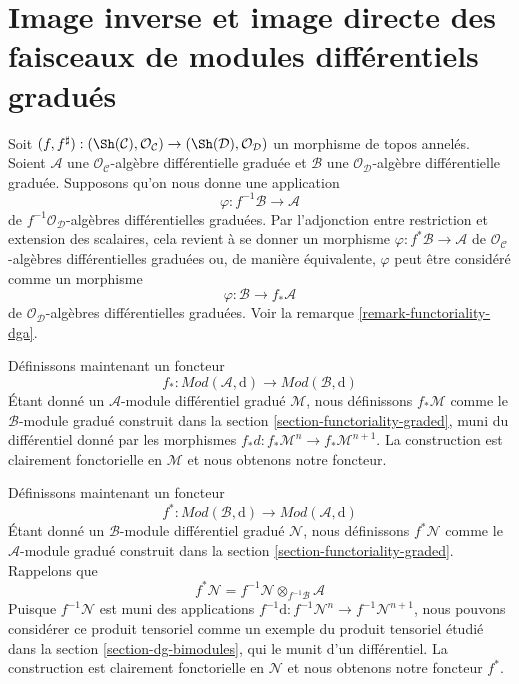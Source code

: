 \section{Image inverse et image directe des faisceaux de modules différentiels gradués}
\label{section-functoriality-dg}

\noindent
Soit $(f, f^\sharp) : (\Sh(\mathcal{C}), \mathcal{O}_\mathcal{C})
\to (\Sh(\mathcal{D}), \mathcal{O}_\mathcal{D})$ un morphisme
de topos annelés. Soient $\mathcal{A}$ une
$\mathcal{O}_\mathcal{C}$-algèbre différentielle graduée et $\mathcal{B}$ une
$\mathcal{O}_\mathcal{D}$-algèbre différentielle graduée. Supposons qu'on nous donne
une application
$$
\varphi : f^{-1}\mathcal{B} \to \mathcal{A}
$$ de
$f^{-1}\mathcal{O}_\mathcal{D}$-algèbres différentielles graduées. Par l'adjonction
entre restriction et extension des scalaires, cela revient à se donner
un morphisme $\varphi : f^*\mathcal{B} \to \mathcal{A}$ de
$\mathcal{O}_\mathcal{C}$-algèbres différentielles graduées ou, de manière équivalente,
$\varphi$ peut être considéré comme un morphisme
$$
\varphi : \mathcal{B} \to f_*\mathcal{A}
$$
de $\mathcal{O}_\mathcal{D}$-algèbres différentielles graduées.
Voir la remarque \ref{remark-functoriality-dga}.

\medskip\noindent
Définissons maintenant un
foncteur $$
f_*
: \textit{Mod}(\mathcal{A}, \text{d})
\longrightarrow
\textit{Mod}(\mathcal{B}, \text{d})
$$
Étant donné un $\mathcal{A}$-module différentiel gradué $\mathcal{M}$, nous
définissons $f_*\mathcal{M}$ comme le $\mathcal{B}$-module gradué construit dans
la section \ref{section-functoriality-graded}, muni du différentiel
donné par les morphismes $f_*d : f_*\mathcal{M}^n \to f_*\mathcal{M}^{n + 1}$. La
construction est clairement fonctorielle en
$\mathcal{M}$ et nous obtenons notre foncteur.

\medskip\noindent
Définissons maintenant un
foncteur $$
f^*
: \textit{Mod}(\mathcal{B}, \text{d})
\longrightarrow
\textit{Mod}(\mathcal{A}, \text{d})
$$
Étant donné un $\mathcal{B}$-module différentiel gradué $\mathcal{N}$,
nous définissons $f^*\mathcal{N}$ comme le $\mathcal{A}$-module
gradué construit dans la section \ref{section-functoriality-graded}.
Rappelons
que $$
f^*\mathcal{N} = f^{-1}\mathcal{N} \otimes_{f^{-1}\mathcal{B}} \mathcal{A}
$$
Puisque $f^{-1}\mathcal{N}$ est muni des applications
$f^{-1}\text{d} : f^{-1}\mathcal{N}^n \to f^{-1}\mathcal{N}^{n + 1}$, nous
pouvons considérer ce produit tensoriel comme un exemple
du produit tensoriel étudié dans la section \ref{section-dg-bimodules},
qui le munit d'un différentiel. La
construction est clairement fonctorielle en
$\mathcal{N}$ et nous obtenons notre foncteur $f^*$.

